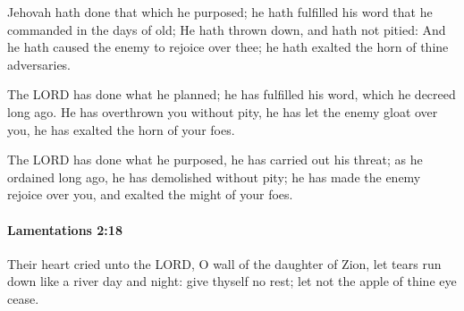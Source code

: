 			\begin{versebox}
					\item[BHS] 
					\item[LXX] 
					\item[ASV] Jehovah hath done that which he purposed; he hath fulfilled his word that he commanded in the days of old; He hath thrown down, and hath not pitied: And he hath caused the enemy to rejoice over thee; he hath exalted the horn of thine adversaries.
					\item[NIV] The LORD has done what he planned; he has fulfilled his word, which he decreed long ago. He has overthrown you without pity, he has let the enemy gloat over you, he has exalted the horn of your foes.
					\item[NRSV] The LORD has done what he purposed, he has carried out his threat; as he ordained long ago, he has demolished without pity; he has made the enemy rejoice over you, and exalted the might of your foes.
			\end{versebox}

		\paragraph{Lamentations 2:18} %
			\label{LAMENTATIONS-2-18}

			Their heart cried unto the LORD, O wall of the daughter of Zion, let tears run down like a river day and night: give thyself no rest; let not the apple of thine eye cease.

